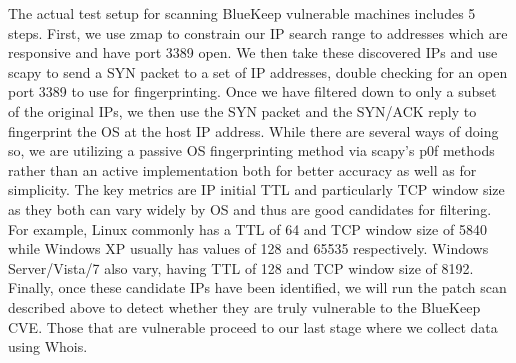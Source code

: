 The actual test setup for scanning BlueKeep vulnerable machines includes 5 steps. First, we use zmap to constrain our IP search range to addresses which are responsive and have port 3389 open. We then take these discovered IPs and use scapy to send a SYN packet to a set of IP addresses, double checking for an open port 3389 to use for fingerprinting. Once we have filtered down to only a subset of the original IPs, we then use the SYN packet and the SYN/ACK reply to fingerprint the OS at the host IP address. While there are several ways of doing so, we are utilizing a passive OS fingerprinting method via scapy's p0f methods rather than an active implementation both for better accuracy as well as for simplicity. The key metrics are IP initial TTL and particularly TCP window size as they both can vary widely by OS and thus are good candidates for filtering. For example, Linux commonly has a TTL of 64 and TCP window size of 5840 while Windows XP usually has values of 128 and 65535 respectively. Windows Server/Vista/7 also vary, having TTL of 128 and TCP window size of 8192. Finally, once these candidate IPs have been identified, we will run the patch scan described above to detect whether they are truly vulnerable to the BlueKeep CVE. Those that are vulnerable proceed to our last stage where we collect data using Whois.
